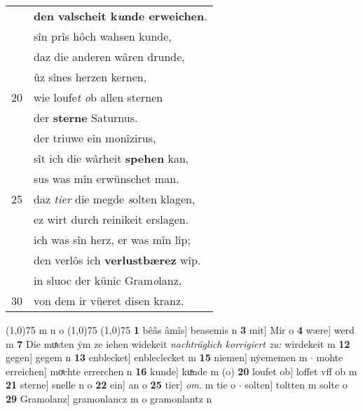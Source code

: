 \documentclass[8pt,a4paper,notitlepage]{article}
\begin{document}
\begin{table}[ht]
\begin{minipage}[t]{0.5\linewidth}
\begin{tabular}{rl}
 & \textbf{den valscheit k\textit{u}nde erweichen}.\\ 
 & sîn prîs hôch wahsen kunde,\\ 
 & daz die anderen wâren drunde,\\ 
 & ûz sînes herzen kernen,\\ 
20 & wie loufe\textit{t o}b allen sternen\\ 
 & der \textbf{sterne} Saturnus.\\ 
 & der triuwe ein monîzirus,\\ 
 & sît ich die wârheit \textbf{spehen} kan,\\ 
 & sus was mîn erwünschet man.\\ 
25 & daz \textit{tier} die megde \textit{s}olten klagen,\\ 
 & ez wirt durch reinikeit erslagen.\\ 
 & ich was sîn herz, er was mîn lîp;\\ 
 & den verlôs ich \textbf{verlustbærez} wîp.\\ 
 & in sluoc der künic Gram\textit{o}lanz,\\ 
30 & von dem ir vüeret disen kranz.\\ 
\end{tabular}
\scriptsize
\line(1,0){75} \newline
m n o \newline
\line(1,0){75} \newline
\newline
\line(1,0){75} \newline
\textbf{1} bêâs âmîs] beasemis n \textbf{3} mit] Mir o \textbf{4} wære] werd m \textbf{7} Die muͯsten ẏm ze iehen widekeit \textit{nachträglich korrigiert zu:} wirdekeit m \textbf{12} gegen] gegem n \textbf{13} enblecket] enbleclecket m \textbf{15} niemen] nẏememen m  $\cdot$ mohte erreichen] moͯchte errerchen n \textbf{16} kunde] kuͯnde m (o) \textbf{20} loufet ob] loffet vff  ob m \textbf{21} sterne] snelle n o \textbf{22} ein] an o \textbf{25} tier] \textit{om.} m tie o  $\cdot$ solten] toltten m solte o \textbf{29} Gramolanz] gramonlancz m o gramonlantz n \newline
\end{minipage}
\end{table}
\newpage
\end{document}
